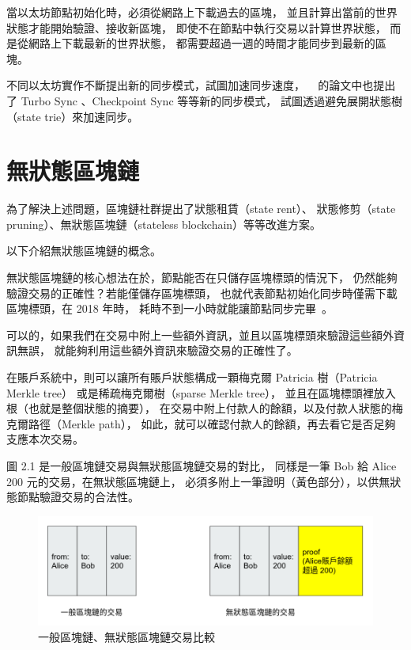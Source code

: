當以太坊節點初始化時，必須從網路上下載過去的區塊，
並且計算出當前的世界狀態才能開始驗證、接收新區塊，
即使不在節點中執行交易以計算世界狀態，
而是從網路上下載最新的世界狀態，
都需要超過一週的時間才能同步到最新的區塊。

不同以太坊實作不斷提出新的同步模式，試圖加速同步速度，
~\cite{qian2018improved} 的論文中也提出了
Turbo Sync 、Checkpoint Sync 等等新的同步模式，
試圖透過避免展開狀態樹（state trie）來加速同步。

\section{無狀態區塊鏈}
為了解決上述問題，區塊鏈社群提出了狀態租賃（state rent）、
狀態修剪（state pruning）、無狀態區塊鏈（stateless blockchain）等等改進方案。

以下介紹無狀態區塊鏈的概念。

無狀態區塊鏈的核心想法在於，節點能否在只儲存區塊標頭的情況下，
仍然能夠驗證交易的正確性？若能僅儲存區塊標頭，
也就代表節點初始化同步時僅需下載區塊標頭，在 2018 年時，
耗時不到一小時就能讓節點同步完畢~\cite{qian2018improved}。

可以的，如果我們在交易中附上一些額外資訊，並且以區塊標頭來驗證這些額外資訊無誤，
就能夠利用這些額外資訊來驗證交易的正確性了。

在賬戶系統中，則可以讓所有賬戶狀態構成一顆梅克爾 Patricia 樹（Patricia Merkle tree）
或是稀疏梅克爾樹（sparse Merkle tree）\cite{dahlberg2016efficient}，
並且在區塊標頭裡放入根（也就是整個狀態的摘要），
在交易中附上付款人的餘額，以及付款人狀態的梅克爾路徑（Merkle path），
如此，就可以確認付款人的餘額，再去看它是否足夠支應本次交易。

圖 2.1 是一般區塊鏈交易與無狀態區塊鏈交易的對比，
同樣是一筆 Bob 給 Alice 200 元的交易，在無狀態區塊鏈上，
必須多附上一筆證明（黃色部分），以供無狀態節點驗證交易的合法性。

\begin{figure}
\includegraphics[width=\textwidth]{stateless-tx}
\caption{一般區塊鏈、無狀態區塊鏈交易比較}
\end{figure}

